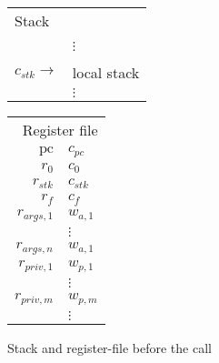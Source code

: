 \documentclass[a4paper]{article}
\newcommand{\var}[1]{\mathit{#1}}
\newcommand{\pc}{\mathit{pc}}
\newcommand{\pcreg}{\mathrm{pc}}
\begin{document}
\begin{figure}
  \label{fig:stack-before-call}
  \centering
  \begin{tabular}[!h]{r | >{\raggedright\arraybackslash}p{3cm} |}
\multicolumn{2}{l}{Stack} \\
   & \\
   & $\vdots$\\
\cline{2-2}
   & 0 \\
\cline{2-2}
$c_{\var{stk}} \rightarrow$   & local stack\\
   & $\vdots$
\end{tabular}
\hspace{1cm}
\begin{tabular}{r | >{\centering\arraybackslash}p{0.75cm} |}
\multicolumn{2}{r}{Register file} \\
\cline{2-2}
$\pcreg$ & $c_{\pc}$\\
\cline{2-2}
$r_0$  & $c_0$ \\
\cline{2-2}
$r_{\var{stk}}$  & $c_{\var{stk}}$ \\
\cline{2-2}
$r_f$ & $c_f$ \\
\cline{2-2}
$r_{\var{args},1}$ & $w_{a,1}$ \\
\cline{2-2}
& $\vdots$ \\
\cline{2-2}
$r_{\var{args},n}$ & $w_{a,1}$\\
\cline{2-2}
$r_{\var{priv},1}$ & $w_{p,1}$\\
\cline{2-2}
& $\vdots$ \\
\cline{2-2}
$r_{\var{priv},m}$ & $w_{p,m}$\\
\cline{2-2}
& $\vdots$ \\
\cline{2-2}
\end{tabular}
\caption{Stack and register-file before the call}
\end{figure}
\end{document}

